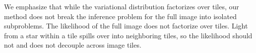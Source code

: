 We emphasize that while the variational distribution factorizes over tiles, our method does not break the inference problem for the full image into isolated subproblems.
The likelihood of the full image does not factorize over tiles. Light from a star within a tile spills over into neighboring tiles, so the likelihood should not and does not decouple across image tiles.
